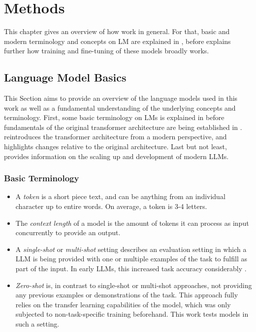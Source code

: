 \chapter{Methods}\label{chap:methods}
This chapter gives an overview of how  work in general.
For that, basic and modern terminology and concepts on \gls{LM} are explained in , before  explains further how training and fine-tuning of these models broadly works.


\section{Language Model Basics}\label{sec:basics}
This Section aims to provide an overview of the language models used in this work as well as a fundamental understanding of the underlying concepts and terminology.
First, some basic terminology on \glspl{LM} is explained in  before fundamentals of the original transformer architecture are being established in .
 reintroduces the transformer architecture from a modern perspective, and highlights changes relative to the original architecture.
Last but not least,  provides information on the scaling up and development of modern \glspl{LLM}.



\subsection{Basic Terminology}\label{sub:terminology}

\begin{itemize}
\item A \textit{token} is a short piece text, and can be anything from an individual character up to entire words. On average, a token is 3-4 letters.
\item The \textit{context length} of a model is the amount of tokens it can process as input concurrently to provide an output.
\item A \textit{single-shot} or \textit{multi-shot} setting describes an evaluation setting in which a \gls{LLM} is being provided with one or multiple examples of the task to fulfill as part of the input. In early \glspl{LLM}, this increased task accuracy considerably \cite{brown_language_2020}.
\item \textit{Zero-shot} is, in contrast to single-shot or multi-shot approaches, not providing any previous examples or demonstrations of the task. This approach fully relies on the transfer learning capabilities of the model, which was only subjected to non-task-specific training beforehand. This work tests models in such a setting.
\end{itemize}

